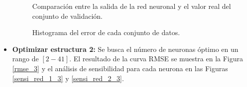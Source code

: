 \documentclass[12pt]{article}
\begin{document}
\begin{itemize}
\begin{figure}
		\caption{Comparación entre la salida de la red neuronal y el valor real del conjunto de validación.}
	\end{figure}
	\begin{figure}
		\centering
		\captionsetup{justification=centering}
		\caption{Histograma del error de cada conjunto de datos.}
		\label{hist_4}
	\end{figure}

	\newpage
	\item \textbf{Optimizar estructura 2:} Se busca el número de neuronas óptimo en un rango de $[2-41]$. El resultado de la curva RMSE se muestra en la Figura \ref{rmse_3} y el análisis de sensibilidad para cada neurona en las Figuras \ref{sensi_red_1_3} y \ref{sensi_red_2_3}.


\end{itemize}
\end{document}

